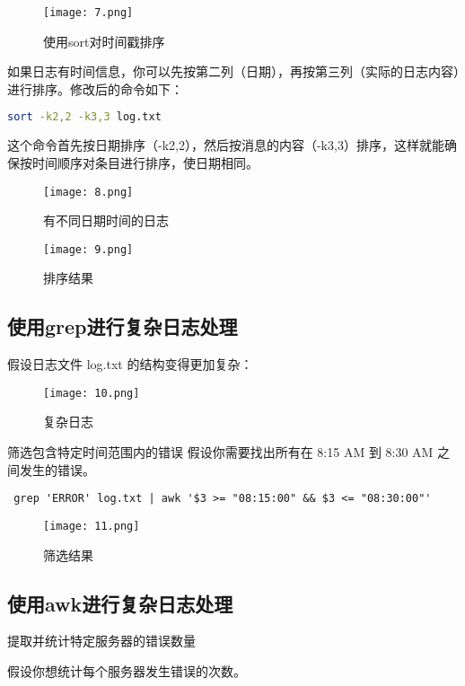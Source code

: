 \documentclass[a4paper, 12pt]{article}
\begin{document}
\begin{figure}[H]
  \centering
    \texttt{[image: 7.png]}
  \caption{使用sort对时间戳排序}
   \end{figure}

 如果日志有时间信息，你可以先按第二列（日期），再按第三列（实际的日志内容）进行排序。修改后的命令如下：
 
\begin{lstlisting}[language=bash]
sort -k2,2 -k3,3 log.txt
\end{lstlisting}

这个命令首先按日期排序（-k2,2），然后按消息的内容（-k3,3）排序，这样就能确保按时间顺序对条目进行排序，使日期相同。

\begin{figure}[H]
  \centering
    \texttt{[image: 8.png]}
  \caption{有不同日期时间的日志}
   \end{figure}

\begin{figure}[H]
  \centering
    \texttt{[image: 9.png]}
  \caption{排序结果}
   \end{figure}

\subsection{使用grep进行复杂日志处理}
 假设日志文件 log.txt 的结构变得更加复杂：
 \begin{figure}[H]
  \centering
    \texttt{[image: 10.png]}
  \caption{复杂日志}
   \end{figure}

 筛选包含特定时间范围内的错误
假设你需要找出所有在 8:15 AM 到 8:30 AM 之间发生的错误。

\begin{verbatim}
 grep 'ERROR' log.txt | awk '$3 >= "08:15:00" && $3 <= "08:30:00"'
  \end{verbatim}

\begin{figure}[H]
  \centering
    \texttt{[image: 11.png]}
  \caption{筛选结果}
   \end{figure}

\subsection{使用awk进行复杂日志处理}
 提取并统计特定服务器的错误数量
 
假设你想统计每个服务器发生错误的次数。
\end{document}
